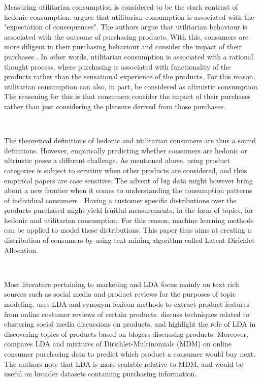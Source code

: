 Measuring utilitarian consumption is considered to be the stark contrast of hedonic consumption. \cite{batra1991measuring} argues that utilitarian consumption is associated with the "expectation of consequences". The authors argue that utilitarian behaviour is associated with the outcome of purchasing products. With this, consumers are more diligent in their purchasing behaviour and consider the impact of their purchases \citep{batra1991measuring}. In other words, utilitarian consumption is associated with a rational thought process, where purchasing is associated with functionality of the products rather than the sensational experience of the products. For this reason, utilitarian consumption can also, in part, be considered as altruistic consumption. The reasoning for this is that consumers consider the impact of their purchases rather than just considering the pleasure derived from those purchases. 


\

The theoretical definitions of hedonic and utilitarian consumers are thus a sound definitions. However, empirically predicting whether consumers are hedonic or ultriustic poses a different challenge. As mentioned above, using product categories is subject to scrutiny when other products are considered, and thus empirical papers are case sensitive. The advent of big data might however bring about a new frontier when it comes to understanding the consumption patterns of individual consumers \cite{BADEASTROIE2014238}. Having a customer specific distributions over the products purchased might yield fruitful measurements, in the form of topics, for hedonic and utilitarian consumption. For this reason, machine learning methods can be applied to model these distributions. This paper thus aims at creating a distribution of consumers by using text mining algorithm called Latent Dirichlet Allocation. 

\

Most literature pertaining to marketing and LDA focus mainly on text rich sources such as social media and product reviews for the purposes of topic modeling. \cite{ma2013lda} uses LDA and synonym lexicon methods to extract product features from online costumer reviews of certain products. \cite{melville2009social} discuss techniques related to clustering social media discussions on products, and highlight the role of LDA in discovering topics of products based on blogers discussing products. Moreover, \cite{jacobs2016model} compares LDA and mixtures of Dirichlet-Multinomials (MDM) on online consumer purchasing data to predict which product a consumer would buy next. The authors note that LDA is more scalable relative to MDM, and would be useful on broader datasets containing purchasing information. 

